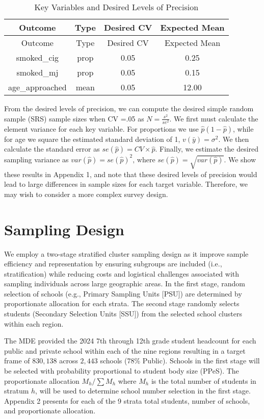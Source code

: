 \documentclass[
  12pt]{article}
\begin{document}
\begin{longtable}[]{@{}cccc@{}}
\caption{Key Variables and Desired Levels of Precision}\tabularnewline
\toprule\noalign{}
Outcome & Type & Desired CV & Expected Mean \\
\midrule\noalign{}
\endfirsthead
\toprule\noalign{}
Outcome & Type & Desired CV & Expected Mean \\
\midrule\noalign{}
\endhead
\bottomrule\noalign{}
\endlastfoot
smoked\_cig & prop & 0.05 & 0.25 \\
smoked\_mj & prop & 0.05 & 0.15 \\
age\_approached & mean & 0.05 & 12.00 \\
\end{longtable}

From the desired levels of precision, we can compute the desired simple
random sample (SRS) sample sizes when CV =.05 as
\(N = \frac{s^2}{se^2}\). We first must calculate the element variance
for each key variable. For proportions we use \(\hat{p}(1-\hat{p})\),
while for age we square the estimated standard deviation of 1,
\(v(\bar{y}) = \sigma^2\). We then calculate the standard error as
\(se(\hat{p}) = CV \times \hat{p}\). Finally, we estimate the desired
sampling variance as
\(var(\hat{p}) =  se(\hat{p})^2 \text{, where }  se(\hat{p}) = \sqrt{var(\hat{p})}\).
We show these results in Appendix 1, and note that these desired levels
of precision would lead to large differences in sample sizes for each
target variable. Therefore, we may wish to consider a more complex
survey design.

\section{Sampling Design}\label{sec-meth}

We employ a two-stage stratified cluster sampling design as it improve
sample efficiency and representation by ensuring subgroups are included
(i.e., stratification) while reducing costs and logistical challenges
associated with sampling individuals across large geographic areas. In
the first stage, random selection of schools (e.g., Primary Sampling
Units {[}PSU{]}) are determined by proportionate allocation for each
strata. The second stage randomly selects students (Secondary Selection
Units {[}SSU{]}) from the selected school clusters within each region.

The MDE provided the 2024 7th through 12th grade student headcount for
each public and private school within each of the nine regions resulting
in a target frame of \(830,138\) across \(2,443\) schools (78\% Public).
Schools in the first stage will be selected with probability
proportional to student body size (PPeS). The proportionate allocation
\(M_h / \sum M_h\) where \(M_h\) is the total number of students in
stratum \(h\), will be used to determine school number selection in the
first stage. Appendix 2 presents for each of the 9 strata total
students, number of schools, and proportionate allocation.
\end{document}

